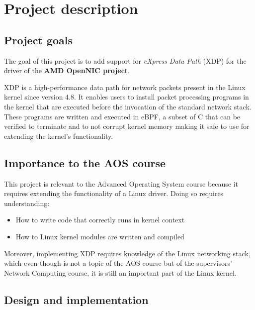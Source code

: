 \documentclass[10pt,a4]{article}
\begin{document}
\section{Project description}

\subsection{Project goals}
The goal of this project is to add support for \textit{eXpress Data Path} (XDP)
for the driver of the \textbf{AMD OpenNIC project}.

XDP is a high-performance data path for network packets present in the Linux
kernel since version 4.8. It enables users to install packet processing programs
in the kernel that are executed before the invocation of the standard network stack.
These programs are written and executed in eBPF, a subset of C that can be
verified to terminate and to not corrupt kernel memory making it safe to use for
extending the kernel's functionality.



\subsection{Importance to the AOS course}
This project is relevant to the Advanced Operating System course because it
requires extending the functionality of a Linux driver. Doing so requires
understanding:

\begin{itemize}
  \item How to write code that correctly runs in kernel context
  \item How to Linux kernel modules are written and compiled
\end{itemize}

Moreover, implementing XDP requires knowledge of the Linux networking
stack, which even though is not a topic of the AOS course but of
the supervisors' Network Computing course, it is still an important part of the
Linux kernel.



\subsection{Design and implementation}
\end{document}

